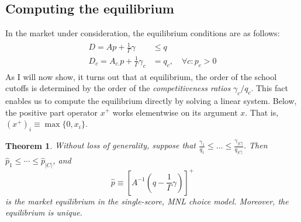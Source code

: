 \documentclass[12pt]{article}
\numberwithin{equation}{subsection}
\newtheorem{theorem}{Theorem}
\theoremstyle{definition}
\begin{document}
\subsection{Computing the equilibrium}
In the market under consideration, the equilibrium conditions are as follows:
\begin{gather} \label{ssmnleqconds}
\begin{aligned}
D = A p + \frac{1}{\Gamma}\gamma &\leq q \\
D_c = A_{c.} p + \frac{1}{\Gamma} \gamma_c &= q_c, \quad \forall c: p_c > 0
\end{aligned}
\end{gather}
As I will now show, it turns out that at equilibrium, the order of the school cutoffs is determined by the order of the \emph{competitiveness ratios} $\gamma_c / q_c$. This fact enables us to compute the equilibrium directly by solving a linear system. Below, the positive part operator $x^+$ works elementwise on its argument $x$. That is, $(x^+)_i \equiv \max\{0, x_i\}$.

\begin{theorem} \label{cutoffsortationthm}
Without loss of generality, suppose that $\frac{\gamma_1}{q_1} \leq \dots \leq \frac{\gamma_{|C|}}{q_{|C|}}$. Then $\hat p_1 \leq \cdots \leq \hat p_{|C|}$, and
\[\hat p \equiv \left[A^{-1} (q - \frac{1}{\Gamma} \gamma) \right]^+\]
is the market equilibrium in the single-score, MNL choice model. Moreover, the equilibrium is unique. 
\end{theorem} 
\end{document}
